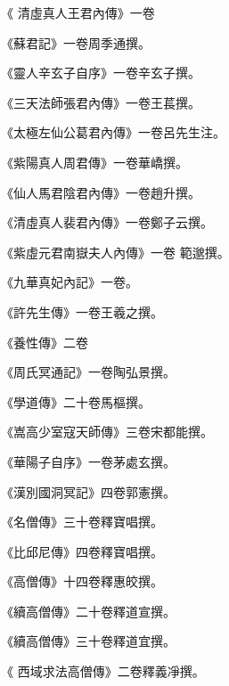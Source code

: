 \begin{pinyinscope}
 《
 清虛真人王君內傳》一卷



 《蘇君記》一卷周季通撰。



 《靈人辛玄子自序》一卷辛玄子撰。



 《三天法師張君內傳》一卷王萇撰。



 《太極左仙公葛君內傳》一卷呂先生注。



 《紫陽真人周君傳》一卷華嶠撰。



 《仙人馬君陰君內傳》一卷趙升撰。



 《清虛真人裴君內傳》一卷鄭子云撰。



 《紫虛元君南嶽夫人內傳》一卷
 範邈撰。



 《九華真妃內記》一卷。



 《許先生傳》一卷王羲之撰。



 《養性傳》二卷



 《周氏冥通記》一卷陶弘景撰。



 《學道傳》二十卷馬樞撰。



 《嵩高少室寇天師傳》三卷宋都能撰。



 《華陽子自序》一卷茅處玄撰。



 《漢別國洞冥記》四卷郭憲撰。



 《名僧傳》三十卷釋寶唱撰。



 《比邱尼傳》四卷釋寶唱撰。



 《高僧傳》十四卷釋惠皎撰。



 《續高僧傳》二十卷釋道宣撰。



 《續高僧傳》三十卷釋道宜撰。



 《
 西域求法高僧傳》二卷釋義凈撰。




\end{pinyinscope}
